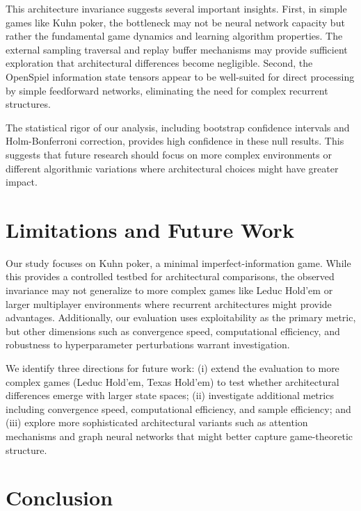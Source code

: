 \documentclass[10pt,twocolumn]{article}
\theoremstyle{definition}
\begin{document}
This architecture invariance suggests several important insights. First, in simple games like Kuhn poker, the bottleneck may not be neural network capacity but rather the fundamental game dynamics and learning algorithm properties. The external sampling traversal and replay buffer mechanisms may provide sufficient exploration that architectural differences become negligible. Second, the OpenSpiel information state tensors appear to be well-suited for direct processing by simple feedforward networks, eliminating the need for complex recurrent structures.

The statistical rigor of our analysis, including bootstrap confidence intervals and Holm-Bonferroni correction, provides high confidence in these null results. This suggests that future research should focus on more complex environments or different algorithmic variations where architectural choices might have greater impact.

\section{Limitations and Future Work}\label{sec:limitations}

Our study focuses on Kuhn poker, a minimal imperfect-information game. While this provides a controlled testbed for architectural comparisons, the observed invariance may not generalize to more complex games like Leduc Hold'em or larger multiplayer environments where recurrent architectures might provide advantages. Additionally, our evaluation uses exploitability as the primary metric, but other dimensions such as convergence speed, computational efficiency, and robustness to hyperparameter perturbations warrant investigation.

We identify three directions for future work: (i) extend the evaluation to more complex games (Leduc Hold'em, Texas Hold'em) to test whether architectural differences emerge with larger state spaces; (ii) investigate additional metrics including convergence speed, computational efficiency, and sample efficiency; and (iii) explore more sophisticated architectural variants such as attention mechanisms and graph neural networks that might better capture game-theoretic structure.

\FloatBarrier
\vspace{12pt}
\section{Conclusion}\label{sec:conclusion}
\end{document}
